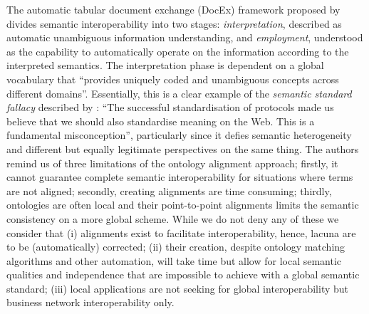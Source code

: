 \documentclass[sort&compress,preprint,authoryear,3p,twocolumn]{elsarticle}
\begin{document}
The automatic tabular document exchange (DocEx) framework proposed by
\cite{Yang2017} divides semantic interoperability into two stages:
\emph{interpretation}, described as automatic unambiguous information
understanding, and \emph{employment}, understood as the capability to
automatically operate on the information according to the interpreted
semantics. The interpretation phase is dependent on a global vocabulary
that ``provides uniquely coded and unambiguous concepts across different
domains''. Essentially, this is a clear example of the \emph{semantic
standard fallacy} described by \cite{Janowicz:2013ui}: ``The successful
standardisation of protocols made us believe that we should also
standardise meaning on the Web. This is a fundamental misconception'',
particularly since it defies semantic heterogeneity and different but
equally legitimate perspectives on the same thing. The authors remind us
of three limitations of the ontology alignment approach; firstly, it
cannot guarantee complete semantic interoperability for situations where
terms are not aligned; secondly, creating alignments are time consuming;
thirdly, ontologies are often local and their point-to-point alignments
limits the semantic consistency on a more global scheme. While we do not
deny any of these we consider that (i) alignments exist to facilitate
interoperability, hence, lacuna are to be (automatically) corrected;
(ii) their creation, despite ontology matching algorithms and other
automation, will take time but allow for local semantic qualities and
independence that are impossible to achieve with a global semantic
standard; (iii) local applications are not seeking for global
interoperability but business network interoperability only.
\end{document}
